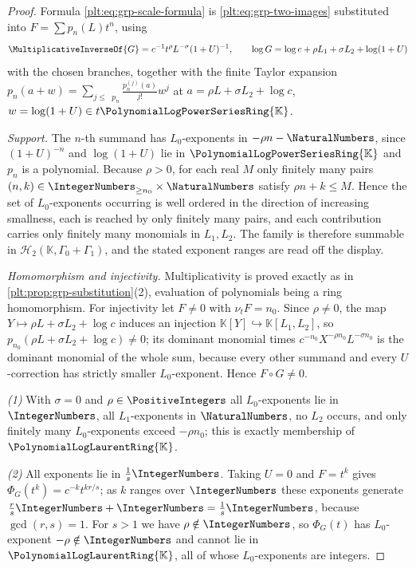 \documentclass[11pt,oneside]{article}
\theoremstyle{plain}
\theoremstyle{definition}
\theoremstyle{remark}
\newcommand{\K}{\mathbb{K}}
\newcommand{\PLpow}{\PolynomialLogPowerSeriesRing{\K}}   %
\newcommand{\PLlau}{\PolynomialLogLaurentRing{\K}}       %
\newcommand{\ordt}{\nu_{t}}                              %
\DeclareMathOperator{\degL}{deg_{L}}
\newcommand{\compose}{\mathbin{\circ}}
\begin{document}
\begin{proof}
Formula \eqref{plt:eq:grp-scale-formula} is \eqref{plt:eq:grp-two-images}
substituted into \(F=\sum p_n(L)t^n\), using
\[
  \MultiplicativeInverseOf{G}=c^{-1}t^{\rho}L^{-\sigma}(1+U)^{-1},
  \qquad
  \log G=\log c+\rho L_1+\sigma L_2+\log(1+U)
\]
with the chosen branches, together with the finite Taylor expansion
\(p_n(a+w)=\sum_{j\le\degL p_n}\frac{p_n^{(j)}(a)}{j!}w^j\) at
\(a=\rho L+\sigma L_2+\log c\), \(w=\log(1+U)\in t\PLpow\).

\emph{Support.}  The \(n\)-th summand has \(L_0\)-exponents in
\(-\rho n-\NaturalNumbers\), since \((1+U)^{-n}\) and \(\log(1+U)\) lie in
\(\PLpow\) and \(p_n\) is a polynomial.  Because \(\rho>0\), for each real
\(M\) only finitely many pairs
\((n,k)\in\IntegerNumbers_{\ge n_0}\times\NaturalNumbers\) satisfy
\(\rho n+k\le M\).  Hence the set of \(L_0\)-exponents occurring is well
ordered in the direction of increasing smallness, each is reached by only
finitely many pairs, and each contribution carries only finitely many monomials
in \(L_1,L_2\).  The family is therefore summable in
\(\mathcal H_2(\K,\Gamma_0+\Gamma_1)\), and the stated exponent ranges are read
off the display.

\emph{Homomorphism and injectivity.}  Multiplicativity is proved exactly as in
\cref{plt:prop:grp-substitution}(2), evaluation of polynomials being a ring
homomorphism.  For injectivity let \(F\ne0\) with \(\ordt F=n_0\).  Since
\(\rho\ne0\), the map \(Y\mapsto\rho L+\sigma L_2+\log c\) induces an injection
\(\K[Y]\hookrightarrow\K[L_1,L_2]\), so
\(p_{n_0}(\rho L+\sigma L_2+\log c)\ne0\); its dominant monomial times
\(c^{-n_0}X^{-\rho n_0}L^{-\sigma n_0}\) is the dominant monomial of the whole
sum, because every other summand and every \(U\)-correction has strictly
smaller \(L_0\)-exponent.  Hence \(F\compose G\ne0\).

\emph{(1)} With \(\sigma=0\) and \(\rho\in\PositiveIntegers\) all
\(L_0\)-exponents lie in \(\IntegerNumbers\), all \(L_1\)-exponents in
\(\NaturalNumbers\), no \(L_2\) occurs, and only finitely many
\(L_0\)-exponents exceed \(-\rho n_0\); this is exactly membership of
\(\PLlau\).

\emph{(2)} All exponents lie in \(\frac1s\IntegerNumbers\).  Taking \(U=0\) and
\(F=t^{k}\) gives \(\Phi_G(t^k)=c^{-k}t^{kr/s}\); as \(k\) ranges over
\(\IntegerNumbers\) these exponents generate
\(\frac{r}{s}\IntegerNumbers+\IntegerNumbers=\frac1s\IntegerNumbers\), because
\(\gcd(r,s)=1\).  For \(s>1\) we have \(\rho\notin\IntegerNumbers\), so
\(\Phi_G(t)\) has \(L_0\)-exponent \(-\rho\notin\IntegerNumbers\) and cannot
lie in \(\PLlau\), all of whose \(L_0\)-exponents are integers.


\end{proof}
\end{document}
